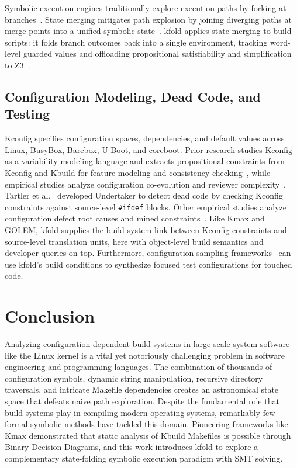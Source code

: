 \documentclass[acmsmall]{acmart}
\newcommand{\tool}{\textsf{kfold}\xspace}
\newcommand{\kmax}{\textsf{Kmax}\xspace}
\begin{document}
Symbolic execution engines traditionally explore execution paths by forking at branches~\cite{king1976symbolic,clarke1976program,cadar2008klee,godefroid2005dart,sen2005cute,nguyen2014using}.
State merging mitigates path explosion by joining diverging paths at merge points into a unified symbolic state~\cite{kuznetsov2012efficient,torlak2014symbolic}.
\tool applies state merging to build scripts: it folds branch outcomes back into a single environment, tracking word-level guarded values and offloading propositional satisfiability and simplification to Z3~\cite{de2008z3}.

\subsection{Configuration Modeling, Dead Code, and Testing}

Kconfig specifies configuration spaces, dependencies, and default values across Linux, BusyBox, Barebox, U-Boot, and coreboot.
Prior research studies Kconfig as a variability modeling language and extracts propositional constraints from Kconfig and Kbuild for feature modeling and consistency checking~\cite{berger2010variability,berger2013variability,dietrich2012variability,dietrich2018variability,oh2021kclause}, while empirical studies analyze configuration co-evolution and reviewer complexity~\cite{passos2013coevolution,melo2016variability}.
Tartler et al.~\cite{tartler2011dead} developed Undertaker to detect dead code by checking Kconfig constraints against source-level \texttt{\#ifdef} blocks.
Other empirical studies analyze configuration defect root causes and mined constraints~\cite{nadi2014where,nadi2014mining,abal2014variability}.
Like \kmax and GOLEM, \tool supplies the build-system link between Kconfig constraints and source-level translation units, here with object-level build semantics and developer queries on top.
Furthermore, configuration sampling frameworks~\cite{medeiros2016comparison} can use \tool's build conditions to synthesize focused test configurations for touched code.

\section{Conclusion}\label{sec:conclusion}

Analyzing configuration-dependent build systems in large-scale system software like the Linux kernel is a vital yet notoriously challenging problem in software engineering and programming languages.
The combination of thousands of configuration symbols, dynamic string manipulation, recursive directory traversals, and intricate Makefile dependencies creates an astronomical state space that defeats naive path exploration.
Despite the fundamental role that build systems play in compiling modern operating systems, remarkably few formal symbolic methods have tackled this domain.
Pioneering frameworks like \kmax demonstrated that static analysis of Kbuild Makefiles is possible through Binary Decision Diagrams, and this work introduces \tool to explore a complementary state-folding symbolic execution paradigm with SMT solving.
\end{document}
